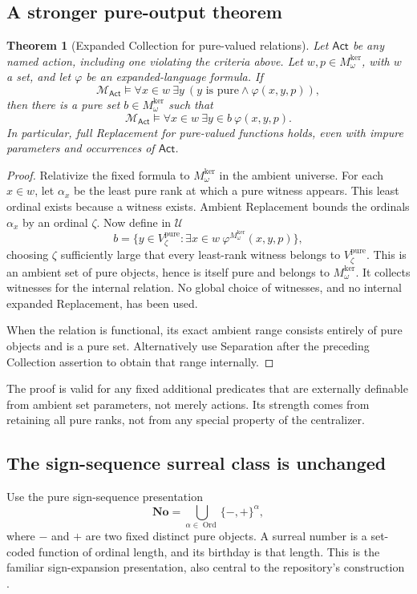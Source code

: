 \documentclass[11pt,letterpaper]{article}
\newtheorem{theorem}{Theorem}[section]
\theoremstyle{definition}
\theoremstyle{remark}
\newcommand{\No}{\mathbf{No}}
\newcommand{\Ord}{\operatorname{Ord}}
\newcommand{\Mker}{M^{\mathrm{ker}}}
\newcommand{\Uk}{\mathcal U}
\newcommand{\Act}{\mathsf{Act}}
\newcommand{\MAct}{\mathcal M_{\Act}}
\begin{document}
\subsection{A stronger pure-output theorem}
\begin{theorem}[Expanded Collection for pure-valued relations]\label{hset:ns:thm:purecollection}
Let $\Act$ be any named action, including one violating the criteria above. Let $w,p\in \Mker_\omega$, with $w$ a set, and let $\varphi$ be an expanded-language formula. If
\[
 \MAct\models\forall x\in w\ \exists y\ (y\text{ is pure}\land\varphi(x,y,p)),
\]
then there is a pure set $b\in \Mker_\omega$ such that
\[
 \MAct\models\forall x\in w\ \exists y\in b\ \varphi(x,y,p).
\]
In particular, full Replacement for pure-valued functions holds, even with impure parameters and occurrences of $\Act$.
\end{theorem}
\begin{proof}
Relativize the fixed formula to $\Mker_\omega$ in the ambient universe. For each $x\in w$, let $\alpha_x$ be the least pure rank at which a pure witness appears. This least ordinal exists because a witness exists. Ambient Replacement bounds the ordinals $\alpha_x$ by an ordinal $\zeta$. Now define in $\Uk$
\[
 b=\{y\in V_\zeta^{\mathrm{pure}}:\exists x\in w\ \varphi^{\Mker_\omega}(x,y,p)\},
\]
choosing $\zeta$ sufficiently large that every least-rank witness belongs to $V_\zeta^{\mathrm{pure}}$. This is an ambient set of pure objects, hence is itself pure and belongs to $\Mker_\omega$. It collects witnesses for the internal relation. No global choice of witnesses, and no internal expanded Replacement, has been used.

When the relation is functional, its exact ambient range consists entirely of pure objects and is a pure set. Alternatively use Separation after the preceding Collection assertion to obtain that range internally.
\end{proof}
The proof is valid for any fixed additional predicates that are externally definable from ambient set parameters, not merely actions. Its strength comes from retaining all pure ranks, not from any special property of the centralizer.

\subsection{The sign-sequence surreal class is unchanged}
Use the pure sign-sequence presentation
\[
 \No=\bigcup_{\alpha\in\Ord}\{-,+\}^{\alpha},
\]
where $-$ and $+$ are two fixed distinct pure objects. A surreal number is a set-coded function of ordinal length, and its birthday is that length. This is the familiar sign-expansion presentation, also central to the repository's construction \cite{Gonshor,ProveItSurrealNS}.
\end{document}
